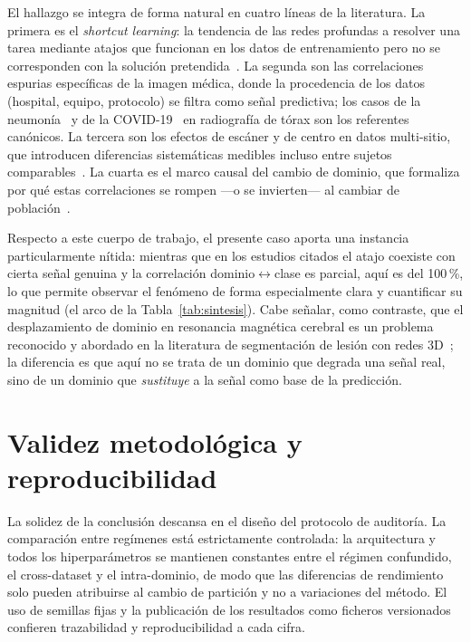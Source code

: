 El hallazgo se integra de forma natural en cuatro líneas de la literatura. La
primera es el \emph{shortcut learning}: la tendencia de las redes profundas a
resolver una tarea mediante atajos que funcionan en los datos de entrenamiento
pero no se corresponden con la solución pretendida~\cite{geirhos2020shortcut}. La
segunda son las correlaciones espurias específicas de la imagen médica, donde la
procedencia de los datos (hospital, equipo, protocolo) se filtra como señal
predictiva; los casos de la neumonía~\cite{zech2018pneumonia} y de la
COVID-19~\cite{degrave2021shortcuts} en radiografía de tórax son los referentes
canónicos. La tercera son los efectos de escáner y de centro en datos
multi-sitio, que introducen diferencias sistemáticas medibles incluso entre
sujetos comparables~\cite{glocker2019scanner}. La cuarta es el marco causal del
cambio de dominio, que formaliza por qué estas correlaciones se rompen ---o se
invierten--- al cambiar de población~\cite{castro2020causality}.

Respecto a este cuerpo de trabajo, el presente caso aporta una instancia
particularmente nítida: mientras que en los estudios citados el atajo
coexiste con cierta señal genuina y la correlación dominio$\leftrightarrow$clase es parcial, aquí
es del 100\,\%, lo que permite observar el fenómeno de forma especialmente clara y
cuantificar su magnitud (el arco de la Tabla~\ref{tab:sintesis}). Cabe señalar,
como contraste, que el desplazamiento de dominio en resonancia magnética cerebral
es un problema reconocido y abordado en la literatura de segmentación de lesión
con redes 3D~\cite{kamnitsas2017deepmedic}; la diferencia es que aquí no se trata
de un dominio que degrada una señal real, sino de un dominio que \emph{sustituye}
a la señal como base de la predicción.

\section{Validez metodológica y reproducibilidad}

La solidez de la conclusión descansa en el diseño del protocolo de auditoría. La
comparación entre regímenes está estrictamente controlada: la arquitectura y todos
los hiperparámetros se mantienen constantes entre el régimen confundido, el
cross-dataset y el intra-dominio, de modo que las diferencias de rendimiento solo
pueden atribuirse al cambio de partición y no a variaciones del método. El uso de
semillas fijas y la publicación de los resultados como ficheros versionados
confieren trazabilidad y reproducibilidad a cada cifra.

